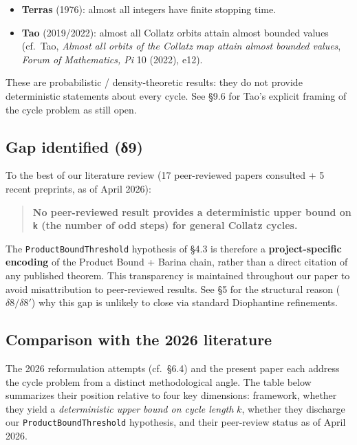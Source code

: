 \documentclass[
  11pt]{amsart}
\providecommand{\tightlist}{%
  \setlength{\itemsep}{0pt}\setlength{\parskip}{0pt}}
\theoremstyle{plain}
\theoremstyle{definition}
\theoremstyle{remark}
\begin{document}
\begin{itemize}
\tightlist
\item
  \textbf{Terras} (1976): almost all integers have finite stopping time.
\item
  \textbf{Tao} (2019/2022): almost all Collatz orbits attain almost
  bounded values (cf.~Tao, \emph{Almost all orbits of the Collatz map
  attain almost bounded values}, \emph{Forum of Mathematics, Pi} 10
  (2022), e12).
\end{itemize}

These are probabilistic / density-theoretic results: they do not provide
deterministic statements about every cycle. See §9.6 for Tao's explicit
framing of the cycle problem as still open.

\subsection{Gap identified (δ9)}\label{gap-identified-ux3b49}

To the best of our literature review (17 peer-reviewed papers consulted
+ 5 recent preprints, as of April 2026):

\begin{quote}
\textbf{No peer-reviewed result provides a deterministic upper bound on
\texttt{k} (the number of odd steps) for general Collatz cycles.}
\end{quote}

The \texttt{ProductBoundThreshold} hypothesis of §4.3 is therefore a
\textbf{project-specific encoding} of the Product Bound + Barina chain,
rather than a direct citation of any published theorem. This
transparency is maintained throughout our paper to avoid misattribution
to peer-reviewed results. See §5 for the structural reason
(\(\delta 8 / \delta 8'\)) why this gap is unlikely to close via
standard Diophantine refinements.

\subsection{Comparison with the 2026
literature}\label{comparison-with-the-2026-literature}

The 2026 reformulation attempts (cf.~§6.4) and the present paper each
address the cycle problem from a distinct methodological angle. The
table below summarizes their position relative to four key dimensions:
framework, whether they yield a \emph{deterministic upper bound on cycle
length} \(k\), whether they discharge our \texttt{ProductBoundThreshold}
hypothesis, and their peer-review status as of April 2026.
\end{document}
